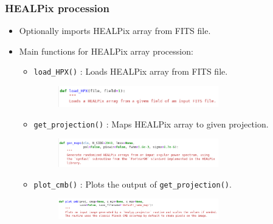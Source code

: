 \begin{frame}
\frametitle{HEALPix procession}

\begin{itemize}
	\item<1-> Optionally imports HEALPix array from FITS file.
	\item<1-> Main functions for HEALPix array procession:
	\begin{itemize}
		\item<1> \texttt{load\_HPX()} : Loads HEALPix array from FITS file.
		\begin{figure}
			\includegraphics[width=0.7\textwidth]{./images/load_hpx.png}
		\end{figure}
		\item<1> \texttt{get\_projection()} : Maps HEALPix array to given projection.
		\begin{figure}
			\includegraphics[width=0.7\textwidth]{./images/gen_maps.png}
		\end{figure}
		\item<1> \texttt{plot\_cmb()} : Plots the output of \texttt{get\_projection()}. 
		\begin{figure}
			\includegraphics[width=0.7\textwidth]{./images/plot_cmb.png}
		\end{figure}
	\end{itemize}
\end{itemize}

\end{frame}